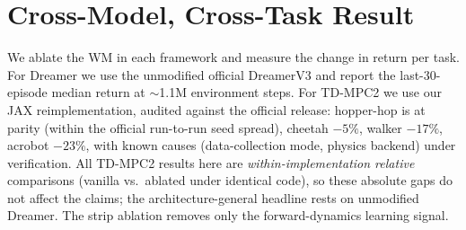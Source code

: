 \documentclass[letterpaper]{article}
\begin{document}
\section{Cross-Model, Cross-Task Result}
\label{sec:cross}
We ablate the WM in each framework and measure the change in return per task.
For Dreamer we use the unmodified official DreamerV3 and report the
last-30-episode median return at $\sim$1.1M environment steps. For TD-MPC2 we
use our JAX reimplementation, audited against the official release: hopper-hop
is at parity (within the official run-to-run seed spread), cheetah $-5\%$,
walker $-17\%$, acrobot $-23\%$, with known causes (data-collection mode,
physics backend) under verification. All TD-MPC2 results here are
\emph{within-implementation relative} comparisons (vanilla vs.\ ablated under
identical code), so these absolute gaps do not affect the claims; the
architecture-general headline rests on unmodified Dreamer. The strip ablation
removes only the forward-dynamics learning signal.
\end{document}

